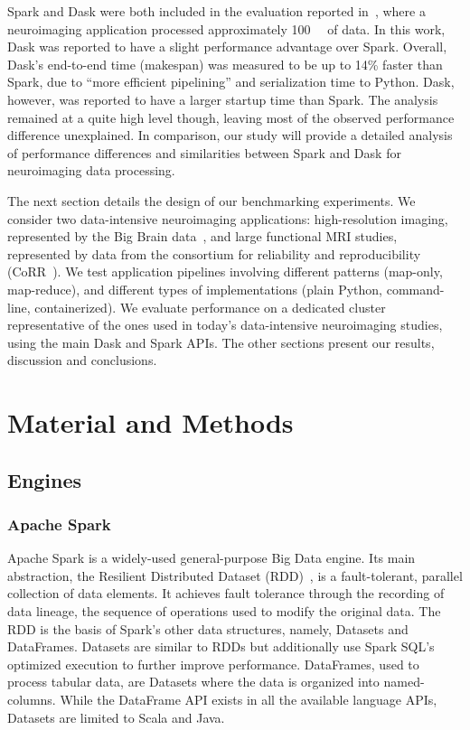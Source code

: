 \documentclass[conference]{IEEEtran}
\begin{document}
Spark and Dask were both included in the evaluation reported
in~\cite{Mehta:17}, where a neuroimaging application
processed approximately \SI{100}{\giga\byte} of data. In this work, Dask was
reported to have a slight performance advantage over Spark. Overall, Dask's
end-to-end time (makespan) was measured to be up to 14\% faster than Spark,
due to ``more efficient pipelining'' %
and serialization time to
Python. %
Dask, however, was reported to have a larger startup
time than Spark. %
The analysis remained at a quite high level
though, leaving most of the observed performance difference unexplained. In
comparison, our study will provide a detailed analysis of performance
differences and similarities between Spark and Dask for neuroimaging data processing.

The next section details the design of our benchmarking experiments. We consider two
data-intensive neuroimaging applications: high-resolution imaging,
represented by the Big Brain data~\cite{Amunts:13}, and large functional
MRI studies, represented by data from the consortium for reliability and
reproducibility (CoRR~\cite{zuo2014open}). We test application pipelines
involving different patterns (map-only, map-reduce), and different types of
implementations (plain Python, command-line,
containerized). We evaluate performance on a dedicated cluster
representative of the ones used in today's data-intensive neuroimaging
studies, using the main Dask and Spark APIs. The other sections present
our results, discussion and conclusions.



\section{Material and Methods}

\subsection{Engines}

\subsubsection{Apache Spark} Apache Spark is a widely-used 
general-purpose Big Data engine.
Its main abstraction, the Resilient Distributed Dataset
(RDD)~\cite{RDD}, is a fault-tolerant, parallel collection of data elements. It 
achieves fault tolerance through the recording of data lineage, the
sequence of operations used to modify the original data. The RDD is the basis
of Spark's other data structures, namely, Datasets
and DataFrames. Datasets are similar to RDDs but additionally use Spark SQL's
optimized execution to further improve performance. DataFrames, used to process
tabular data, are Datasets where the data is organized into named-columns.
While the DataFrame API exists in all the available language APIs, Datasets are
limited to Scala and Java.
\end{document}
